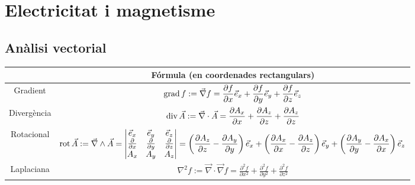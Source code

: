 \documentclass[class=article,10pt,crop=false]{standalone}
\begin{document}
\section{Electricitat i magnetisme}
\subsection{Anàlisi vectorial}
\begin{center}
\begin{tabular}{|c|c|}

    \hline
     & Fórmula (en coordenades rectangulars) \\
        \hline
    Gradient & $\displaystyle\operatorname{grad} f:=\Vec{\nabla}f=\frac{\partial f}{\partial x}\Vec{e}_x+\frac{\partial f}{\partial y}\Vec{e}_y+\frac{\partial f}{\partial z}\Vec{e}_z$ \\
        \hline
    Divergència & $\displaystyle\operatorname{div} \Vec{A}:=\Vec{\nabla}\cdot\Vec{A}=\frac{\partial A_x}{\partial x}+\frac{\partial A_z}{\partial z}+\frac{\partial A_z}{\partial z}$\\
        \hline
    Rotacional & $\displaystyle\operatorname{rot} \Vec{A}:=\Vec{\nabla}\wedge\Vec{A}=\begin{vmatrix}
    \Vec{e}_x & \Vec{e}_y & \Vec{e}_z\\
    \frac{\partial}{\partial x} & \frac{\partial}{\partial y} & \frac{\partial}{\partial z}\\
    A_x & A_y & A_z\\
    \end{vmatrix}=\left(\frac{\partial A_z}{\partial z}-\frac{\partial A_y}{\partial y}\right)\Vec{e}_x+\left(\frac{\partial A_x}{\partial x}-\frac{\partial A_z}{\partial z}\right)\Vec{e}_y+\left(\frac{\partial A_y}{\partial y}-\frac{\partial A_x}{\partial x}\right)\Vec{e}_z$ \\
        \hline
   Laplaciana & $\displaystyle\nabla^2f:=\Vec{\nabla}\cdot\Vec{\nabla}f=\frac{\partial^2f}{\partial x^2}+\frac{\partial^2f}{\partial y^2}+\frac{\partial^2f}{\partial z^2}$ \\
        \hline
\end{tabular}
\end{center}
\end{document}
